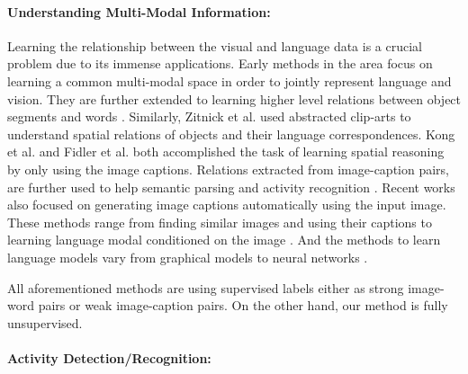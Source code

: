 \paragraph{Understanding Multi-Modal Information:}
Learning the relationship between the visual and language data is a crucial problem due to its immense applications. Early methods \cite{matching} in the area focus on learning a common multi-modal space in order to jointly represent language and vision. They are further extended to learning higher level relations between object segments and words \cite{connecting}. Similarly, Zitnick et al.\cite{zitnick2013learning,zitnick2013bringing} used abstracted clip-arts to understand spatial relations of objects and their language correspondences. Kong et al. \cite{kong2014you} and Fidler et al. \cite{fidler2013sentence} both accomplished the task of learning spatial reasoning by only using the image captions. Relations extracted from image-caption pairs, are further used to help semantic parsing \cite{yu2013grounded} and activity recognition \cite{motwani2012improving}. Recent works also focused on generating image captions automatically using the input image. These methods range from finding similar images and using their captions \cite{ordonez2011im2text} to learning language modal conditioned on the image \cite{kiros2014multimodal,socher2014grounded,farhadi2010every}. And the methods to learn language models vary from graphical models \cite{farhadi2010every} to neural networks \cite{socher2014grounded,kiros2014multimodal,deepAlignment}.

All aforementioned methods are using supervised labels either as strong image-word pairs or weak image-caption pairs. On the other hand, our method is fully unsupervised.

\paragraph{Activity Detection/Recognition:}


